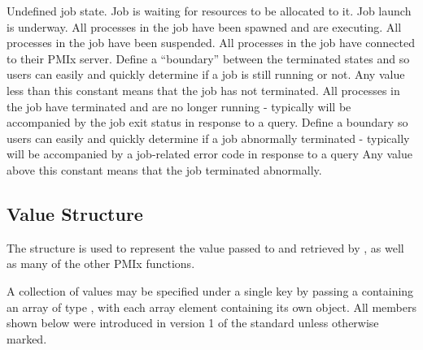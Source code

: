 \begin{constantdesc}
%
Undefined job state.
%
Job is waiting for resources to be allocated to it.
%
Job launch is underway.
%
All processes in the job have been spawned and are executing.
%
All processes in the job have been suspended.
%
All processes in the job have connected to their \ac{PMIx} server.
%
Define a ``boundary'' between the terminated states and  so users can easily and quickly determine if a job is still running or not.
Any value less than this constant means that the job has not terminated.
%
All processes in the job have terminated and are no longer running - typically will be accompanied by the job exit status in response to a query.
%
Define a boundary so users can easily and quickly determine if a job abnormally terminated - typically will be accompanied by a job-related error code in response to a query
Any value above this constant means that the job terminated abnormally.
%
\end{constantdesc}


\subsection{Value Structure}

The  structure is used to represent the value passed to  and retrieved by , as well as many of the other \ac{PMIx} functions.

A collection of values may be specified under a single key by passing a  containing an array of type , with each array element containing its own object. All members shown below were introduced in version 1 of the standard unless otherwise marked.

